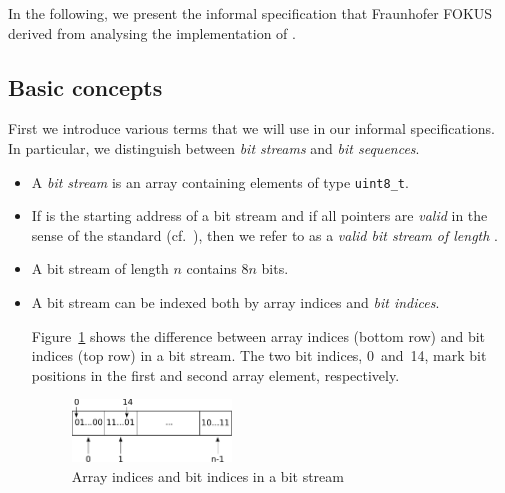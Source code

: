 

In the following, we present the informal 
specification that Fraunhofer FOKUS derived from analysing the 
implementation of \bitwalker.

\subsection{Basic concepts}

First we introduce various terms that we will use in our informal specifications.
In particular, we distinguish between \emph{bit streams} and \emph{bit sequences}.

\begin{itemize}
\item
A \emph{bit stream} is an array containing elements of type \verb"uint8_t".

\item
If  is the starting address of a bit stream and
if all pointers  are \emph{valid} in the sense
of the \isoc standard (cf.~\cite[\S~6.5.3.2(4)]{ISO:C99}),
then we refer to  as a \emph{valid bit stream of length }.

\item 
A bit stream of length $n$ contains $8n$ bits.

\item 
A bit stream can be indexed both by array indices
and \emph{bit indices}.

Figure~\ref{fig:bitstream-indices} shows the difference between 
array indices (bottom row) and bit indices (top row) in a bit stream.
The two bit indices, 0~and~14,
mark bit positions in the first and second array element, respectively.

\begin{figure}[hbt]
\begin{center}
\includegraphics[width=0.40\textwidth]{figures/array_as_stream.pdf}
\caption{\label{fig:bitstream-indices} Array indices and bit indices in a bit stream}
\end{center}
\end{figure}


\end{itemize}

